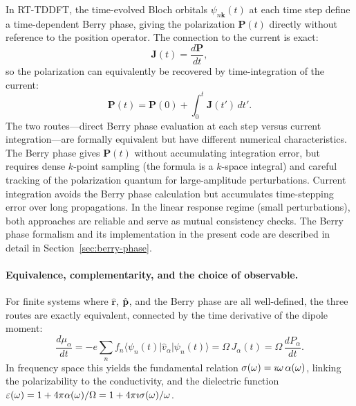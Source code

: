 In RT-TDDFT, the time-evolved Bloch orbitals $\psi_{n\mathbf{k}}(t)$
at each time step define a time-dependent Berry phase, giving the
polarization $\mathbf{P}(t)$ directly without reference to the
position operator.
The connection to the current is exact:
\begin{equation}
  \mathbf{J}(t) = \frac{d\mathbf{P}}{dt},
  \label{eq:J-dPdt}
\end{equation}
so the polarization can equivalently be recovered by time-integration
of the current:
\begin{equation}
  \mathbf{P}(t) = \mathbf{P}(0) + \int_0^t\!\mathbf{J}(t')\,dt'.
  \label{eq:P-from-J}
\end{equation}
The two routes---direct Berry phase evaluation at each step versus
current integration---are formally equivalent but have different
numerical characteristics.
The Berry phase gives $\mathbf{P}(t)$ without accumulating
integration error, but requires dense $k$-point sampling (the
formula is a $k$-space integral) and careful tracking of the
polarization quantum for large-amplitude perturbations.
Current integration avoids the Berry phase calculation but
accumulates time-stepping error over long propagations.
In the linear response regime (small perturbations), both approaches
are reliable and serve as mutual consistency checks.
The Berry phase formalism and its implementation in the present code
are described in detail in Section~\ref{sec:berry-phase}.

\paragraph{Equivalence, complementarity, and the choice of
observable.}
For finite systems where $\hat{\mathbf{r}}$, $\hat{\mathbf{p}}$, and the Berry
phase are all well-defined, the three routes are exactly equivalent,
connected by the time derivative of the dipole moment:
\begin{equation}
  \frac{d\mu_\alpha}{dt}
  = -e\sum_n f_n
    \langle\psi_n(t)|\hat{v}_\alpha|\psi_n(t)\rangle
  = \Omega\,J_\alpha(t)
  = \Omega\,\frac{dP_\alpha}{dt}.
  \label{eq:mu-J-P-equiv}
\end{equation}
In frequency space this yields the fundamental relation
$\sigma(\omega) = \imath\omega\,\alpha(\omega)$, linking the
polarizability to the conductivity, and the dielectric function
$\varepsilon(\omega) = 1 + 4\pi\alpha(\omega)/\Omega
= 1 + 4\pi\imath\sigma(\omega)/\omega$.


